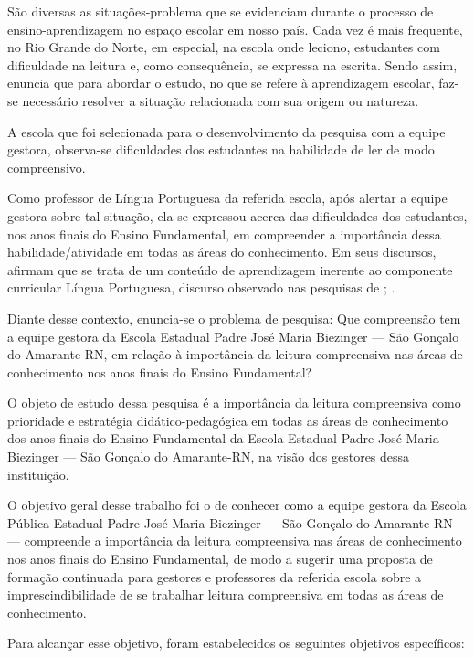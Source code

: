 \begin{refsection}
    São diversas as situações-problema que se evidenciam durante o processo de ensino-aprendizagem no espaço escolar em nosso país. Cada vez é mais frequente, no Rio Grande do Norte, em especial, na escola onde leciono, estudantes com dificuldade na leitura e, como consequência, se expressa na escrita. Sendo assim, \textcite{Sanchez2012} enuncia que para abordar o estudo, no que se refere à aprendizagem escolar, faz-se necessário resolver a situação relacionada com sua origem ou natureza.

    A escola que foi selecionada para o desenvolvimento da pesquisa com a equipe gestora, observa-se dificuldades dos estudantes na habilidade de ler de modo compreensivo. 

    Como professor de Língua Portuguesa da referida escola, após alertar a equipe gestora sobre tal situação, ela se expressou acerca das dificuldades dos estudantes, nos anos finais do Ensino Fundamental, em compreender a importância dessa habilidade/atividade em todas as áreas do conhecimento. Em seus discursos, afirmam que se trata de um conteúdo de aprendizagem inerente ao componente curricular Língua Portuguesa, discurso observado nas pesquisas de \textcite{Leffa1996Fatores}; \textcite{Geraldi1991Psicopedagogia}.  

    Diante desse contexto, enuncia-se o problema de pesquisa: Que compreensão tem a equipe gestora da Escola Estadual Padre José Maria Biezinger --- São Gonçalo do Amarante-RN, em relação à importância da leitura compreensiva nas áreas de conhecimento nos anos finais do Ensino Fundamental? 

    O objeto de estudo dessa pesquisa é a importância da leitura compreensiva como prioridade e estratégia didático-pedagógica em todas as áreas de conhecimento dos anos finais do Ensino Fundamental da Escola Estadual Padre José Maria Biezinger --- São Gonçalo do Amarante-RN, na visão dos gestores dessa instituição. 

    O objetivo geral desse trabalho foi o de conhecer como a equipe gestora da Escola Pública Estadual Padre José Maria Biezinger --- São Gonçalo do Amaran\-te-RN --- compreende a importância da leitura compreensiva nas áreas de conhecimento nos anos finais do Ensino Fundamental, de modo a sugerir uma proposta de formação continuada para gestores e professores da referida escola sobre a imprescindibilidade de se trabalhar leitura compreensiva em todas as áreas de conhecimento. 

    Para alcançar esse objetivo, foram estabelecidos os seguintes objetivos específicos:


\end{refsection}
